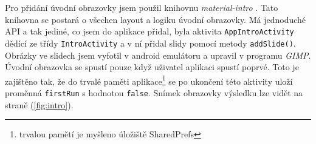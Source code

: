 \documentclass[../TakeYourPill.tex]{subfiles}
\begin{document}
Pro přidání úvodní obrazovky jsem použil knihovnu \textit{material-intro} \cite{intro}. Tato knihovna se postará o všechen layout a logiku úvodní obrazovky. Má jednoduché API a tak jediné, co jsem do aplikace přidal, byla aktivita \texttt{AppIntroActivity} dědící ze třídy \texttt{IntroActivity} a v ní přidal slidy pomocí metody \texttt{addSlide()}. Obrázky ve slidech jsem vyfotil v android emulátoru a upravil v programu \textit{GIMP}. Úvodní obrazovka se spustí pouze když uživatel aplikaci spustí poprvé. Toto je zajištěno tak, že do trvalé paměti aplikace\footnote{trvalou pamětí je myšleno úložiště SharedPrefs} se po ukončení této aktivity uloží proměnná \texttt{firstRun} s hodnotou \texttt{false}. Snímek obrazovky výsledku lze vidět na straně \pageref{fig:intro} (\ref{fig:intro}).
\end{document}
